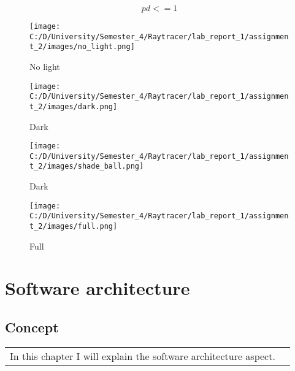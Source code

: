 \documentclass{article}
\begin{document}
	                
	                	                \[ pd <=1 \]
	                	\begin{figure}[h]
	                	\begin{center}
	                		\texttt{[image: C:/D/University/Semester\_4/Raytracer/lab\_report\_1/assignment\_2/images/no\_light.png]}
	                		
	                		\caption{No light}
	                		\label{fig:boat1}
	                	\end{center}
	                \end{figure}


	                	\begin{figure}[h]
	\begin{center}
		\texttt{[image: C:/D/University/Semester\_4/Raytracer/lab\_report\_1/assignment\_2/images/dark.png]}
		
		\caption{Dark}
		\label{fig:boat1}
	\end{center}
\end{figure}


	\begin{figure}[h]
	\begin{center}
	\texttt{[image: C:/D/University/Semester\_4/Raytracer/lab\_report\_1/assignment\_2/images/shade\_ball.png]}
	
	\caption{Dark}
	\label{fig:boat1}
\end{center}
\end{figure}

	\begin{figure}[h]
	\begin{center}
		\texttt{[image: C:/D/University/Semester\_4/Raytracer/lab\_report\_1/assignment\_2/images/full.png]}
		
		\caption{Full}
		\label{fig:boat1}
	\end{center}
\end{figure}

\section{Software architecture}
\subsection{Concept}
\begin{tabular}{ll}
	In this chapter I will explain the software architecture aspect. 
\end{tabular}






\end{document}
